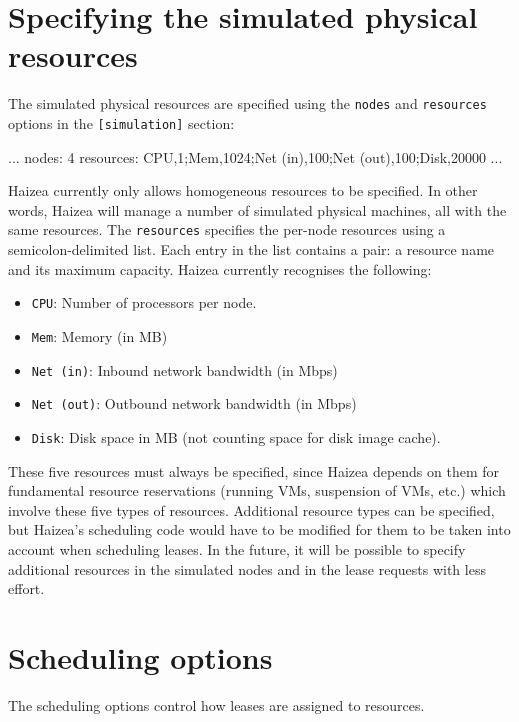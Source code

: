\section{Specifying the simulated physical resources}

The simulated physical resources are specified using the \texttt{nodes} and \texttt{resources} options in the \texttt{[simulation]} section:

\begin{wideshellverbatim}
[simulation]
...
nodes: 4
resources: CPU,1;Mem,1024;Net (in),100;Net (out),100;Disk,20000
...
\end{wideshellverbatim}

Haizea currently only allows homogeneous resources to be specified. In other words, Haizea will manage a number of simulated physical machines, all with the same resources. The \texttt{resources} specifies the per-node resources using a semicolon-delimited list. Each entry in the list contains a pair: a resource name and its maximum capacity. Haizea currently recognises the following:

\begin{itemize}
\item \texttt{CPU}: Number of processors per node.
\item \texttt{Mem}: Memory (in MB)
\item \texttt{Net (in)}: Inbound network bandwidth (in Mbps) 
\item \texttt{Net (out)}: Outbound network bandwidth (in Mbps) 
\item \texttt{Disk}: Disk space in MB (not counting space for disk image cache).
\end{itemize}

These five resources must always be specified, since Haizea depends on them for fundamental resource reservations (running VMs, suspension of VMs, etc.) which involve these five types of resources. Additional resource types can be specified, but Haizea's scheduling code would have to be modified for them to be taken into account when scheduling leases. In the future, it will be possible to specify additional resources in the simulated nodes and in the lease requests with less effort.

\section{Scheduling options}

The scheduling options control how leases are assigned to resources.

